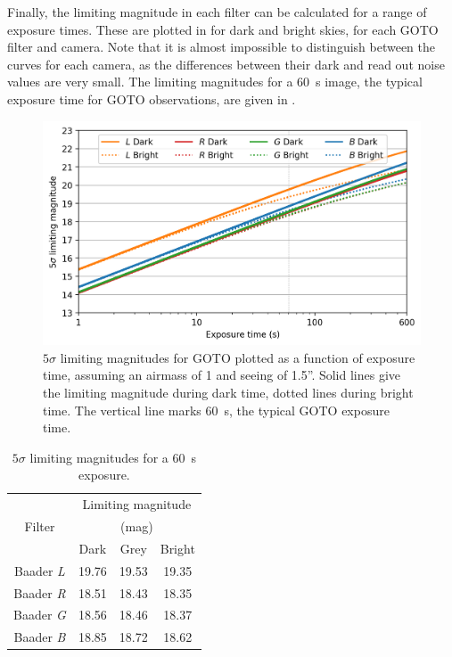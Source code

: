 \begin{colsection}
Finally, the limiting magnitude in each filter can be calculated for a range of exposure times. These are plotted in  for dark and bright skies, for each GOTO filter and camera. Note that it is almost impossible to distinguish between the curves for each camera, as the differences between their dark and read out noise values are very small. The limiting magnitudes for a \SI{60}{\second} image, the typical exposure time for GOTO observations, are given in .

\begin{figure}[t]
    \begin{center}
        \includegraphics[width=\linewidth]{images/throughput/limiting_mag.png}
    \end{center}
    \caption[$5\sigma$ limiting magnitudes for GOTO]{
        $5\sigma$ limiting magnitudes for GOTO plotted as a function of exposure time, assuming an airmass of 1 and seeing of 1.5''. Solid lines give the limiting magnitude during dark time, dotted lines during bright time. The vertical line marks \SI{60}{\second}, the typical GOTO exposure time.
    }\label{fig:lim_mags}
\end{figure}

\begin{table}[t]
    \begin{center}
        \begin{tabular}{c|ccc} %
                   & \multicolumn{3}{c}{Limiting magnitude} \\
            Filter & \multicolumn{3}{c}{(mag)} \\
                   & Dark & Grey & Bright \\
            \midrule
            Baader \textit{L} & 19.76 & 19.53 & 19.35 \\
            Baader \textit{R} & 18.51 & 18.43 & 18.35 \\
            Baader \textit{G} & 18.56 & 18.46 & 18.37 \\
            Baader \textit{B} & 18.85 & 18.72 & 18.62 \\
        \end{tabular}
    \end{center}
    \caption[$5\sigma$ limiting magnitudes for a \SI{60}{\second} exposure]{
        $5\sigma$ limiting magnitudes for a \SI{60}{\second} exposure.
    }\label{tab:lim_mags}
\end{table}


\end{colsection}
